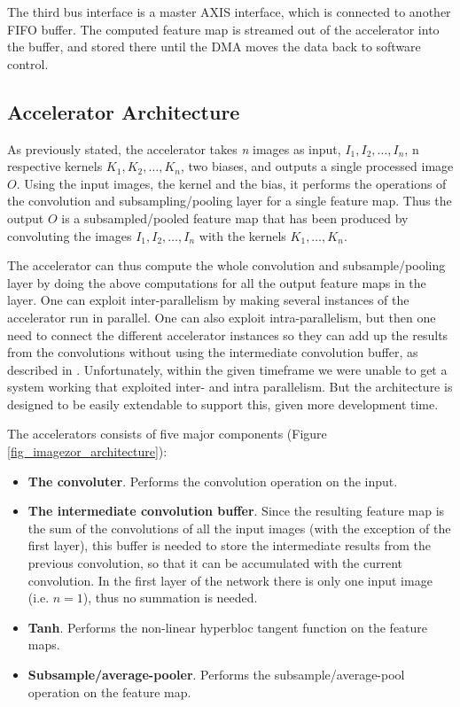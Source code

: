 The third bus interface is a master AXIS interface, which is connected to another FIFO buffer. The computed feature map is streamed out of the accelerator into the buffer, and stored there until the DMA  moves the data back to software control.

 



\subsection{Accelerator Architecture}

As previously stated, the accelerator takes \textit{n} images as input, $ I_1, I_2, \dots, I_n $, n respective kernels $ K_1, K_2, \dots, K_n $, two biases, and outputs a single processed image $ O $. Using the input images, the kernel and the bias, it performs the operations of the convolution and subsampling/pooling layer for a single feature map. Thus the output $ O $ is a subsampled/pooled feature map that has been produced by convoluting the images $ I_1, I_2, \dots, I_n $ with the kernels $ K_1, \dots, K_n $. 

The accelerator can thus compute the whole convolution and subsample/pooling layer by doing the above computations for all the output feature maps in the layer. One can exploit inter-parallelism by making several instances of the accelerator run in parallel. One can also exploit intra-parallelism, but then one need to connect the different accelerator instances so they can add up the results from the convolutions without using the intermediate convolution buffer, as described in \cite{Chakradhar2010}. Unfortunately, within the given timeframe we were unable to get a system working that exploited inter- and intra parallelism. But the architecture is designed to be easily extendable to support this, given more development time. 


The accelerators consists of five major components (Figure \ref{fig_imagezor_architecture}):

\begin{itemize}
	\item \textbf{The convoluter}. Performs the convolution operation on the input.
	\item \textbf{The intermediate convolution buffer}. Since the resulting feature map is the sum of the convolutions of all the input images (with the exception of the first layer), this buffer is needed to store the intermediate results from the previous convolution, so that it can be accumulated with the current convolution. In the first layer of the network there is only one input image (i.e. $ n = 1 $), thus no summation is needed.
	\item \textbf{Tanh}. Performs the non-linear hyperbloc tangent function  on the feature maps.
	\item \textbf{Subsample/average-pooler}. Performs the subsample/average-pool operation on the feature map. 
\end{itemize}

